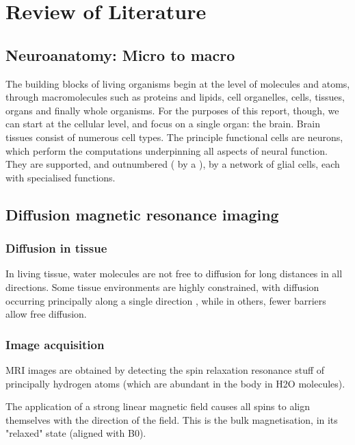\chapter{Review of Literature}
\label{chapterlabel1}

\section{Neuroanatomy: Micro to macro}

The building blocks of living organisms begin at the level of molecules and atoms, through macromolecules such as proteins and lipids, cell organelles, cells, tissues, organs and finally whole organisms.
For the purposes of this report, though, we can start at the cellular level, and focus on a single organ: the brain.
Brain tissues consist of numerous cell types.
The principle functional cells are neurons, which perform the computations underpinning all aspects of neural function. They are supported, and outnumbered ( by a ), by a network of glial cells, each with specialised functions.

\section{Diffusion magnetic resonance imaging}

\subsection{Diffusion in tissue}

In living tissue, water molecules are not free to diffusion for long distances in all directions. Some tissue environments are highly constrained, with diffusion occurring principally along a single direction , while in others, fewer barriers allow free diffusion.

\subsection{Image acquisition}

MRI images are obtained by detecting the spin relaxation resonance stuff of principally hydrogen atoms (which are abundant in the body in H2O molecules).

The application of a strong linear magnetic field causes all spins to align themselves with the direction of the field. This is the bulk magnetisation, in its "relaxed" state (aligned with B0).
